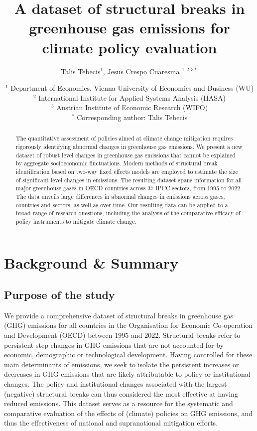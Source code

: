 \documentclass[a4paper]{article}
\title{A dataset of structural breaks in greenhouse gas emissions for climate policy evaluation}
\author{Talis Tebecis$^1$, Jesus Crespo Cuaresma $^{1,2,3 *}$}
\date{
    $^1$ Department of Economics, Vienna University of Economics and Business (WU) \\
    $^2$ International Institute for Applied Systems Analysis (IIASA) \\
    $^3$ Austrian Institute of Economic Research (WIFO) \\
    $^*$ Corresponding author: Talis Tebecis
}
\begin{document}
\maketitle


\begin{abstract}
The quantitative assessment of policies aimed at climate change mitigation requires rigorously identifying abnormal changes in greenhouse gas emissions. We present a new dataset of robust level changes in greenhouse gas emissions that cannot be explained by aggregate socioeconomic fluctuations. Modern methods of structural break identification based on two-way fixed effects models are employed to estimate the size of significant level changes in emissions. The resulting dataset spans information for all major greenhouse gases in OECD countries across 37 IPCC sectors, from 1995 to 2022. The data unveils large differences in abnormal changes in emissions across gases, countries and sectors, as well as over time. Our resulting data can be applied to a broad range of research questions, including the analysis of the comparative efficacy of policy instruments to mitigate climate change.
\end{abstract}

\flushbottom
\maketitle
\thispagestyle{empty}


\section*{Background \& Summary}

\subsection*{Purpose of the study}

We provide a comprehensive dataset of structural breaks in greenhouse gas (GHG) emissions for all countries in the Organisation for Economic Co-operation and Development (OECD) between 1995 and 2022. \cite{breaks_database} Structural breaks refer to persistent step changes in GHG emissions that are not accounted for by economic, demographic or technological development. Having controlled for these main determinants of emissions, we seek to isolate the persistent increases or decreases in GHG emissions that are likely attributable to policy or institutional changes. The policy and institutional changes associated with the largest (negative) structural breaks can thus considered the most effective at having reduced emissions. This dataset serves as a resource for the systematic and comparative evaluation of the effects of (climate) policies on GHG emissions, and thus the effectiveness of national and supranational mitigation efforts.
\end{document}
